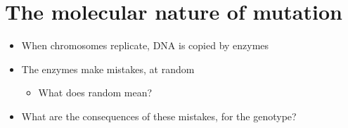 \section{The molecular nature of mutation}

\begin{frame}[t]
    \begin{adjustwidth}{-1.5em}{-1.5em}
        \begin{itemize}
            \item When chromosomes replicate, DNA is copied by enzymes

            \vspace{5mm}
            \item The enzymes make mistakes, at random
                \begin{itemize}
                    \item What does random mean?

                \end{itemize}

            \vspace{5mm}
            \item What are the consequences of these mistakes, for the genotype?


        \end{itemize}
    \end{adjustwidth}
\end{frame}

